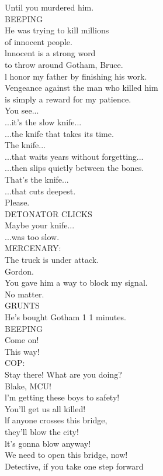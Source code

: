 \documentclass{article}
\begin{document}
\begin{multicols}{3}
Until you murdered him.\\
BEEPING\\
He was trying to kill millions\\
of innocent people.\\
lnnocent is a strong word\\
to throw around Gotham, Bruce.\\
l honor my father by finishing his work.\\
Vengeance against the man who killed him\\
is simply a reward for my patience.\\
You see...\\
...it's the slow knife...\\
...the knife that takes its time.\\
The knife...\\
...that waits years without forgetting...\\
...then slips quietly between the bones.\\
That's the knife...\\
...that cuts deepest.\\
Please.\\
DETONATOR CLICKS\\
Maybe your knife...\\
...was too slow.\\
MERCENARY:\\
The truck is under attack.\\
Gordon.\\
You gave him a way to block my signal.\\
No matter.\\
GRUNTS\\
He's bought Gotham 1 1 minutes.\\
BEEPING\\
Come on!\\
This way!\\
COP:\\
Stay there! What are you doing?\\
Blake, MCU!\\
l'm getting these boys to safety!\\
You'll get us all killed!\\
lf anyone crosses this bridge,\\
they'll blow the city!\\
lt's gonna blow anyway!\\
We need to open this bridge, now!\\
Detective, if you take one step forward\\

\end{multicols}
\end{document}
